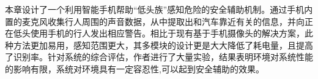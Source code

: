 本章设计了一个利用智能手机帮助“低头族”感知危险的安全辅助机制。通过手机内置的麦克风收集行人周围的声音数据，从中提取出和汽车靠近有关的信息，并向正在低头使用手机的行人发出相应警告。相比于现有基于手机摄像头的解决方案，此种方法更加易用，感知范围更大，其多模块的设计更是大大降低了耗电量，且提高了识别率。针对系统的综合评估，作者进行了大量实验，结果表明环境对系统性能的影响有限，系统对环境具有一定容忍性,可以起到安全辅助的效果。











